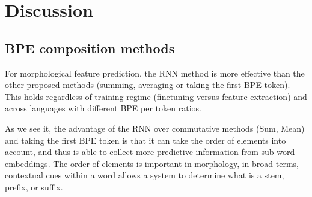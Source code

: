 \documentclass[11pt]{article}
\newcommand\jp[1]{(\textbf{JP:} #1)}
\begin{document}
\begin{figure}
	\end{figure}

	
	
	\section{Discussion}

    \subsection{BPE composition methods}
        For morphological feature prediction, the RNN method is more
     effective than the other proposed methods (summing, averaging or
     taking the first BPE token). This holds regardless of training
     regime (finetuning versus feature extraction) and across
     languages with different BPE per token ratios.
    
             As we see it, the advantage of the RNN over commutative
     methods (Sum, Mean) and taking the first BPE token is that it can
     take the order of elements into account, and thus is able to
     collect more predictive information from sub-word embeddings. The
     order of elements is important in morphology, in broad terms,
     contextual cues within a word allows a system to determine what
     is a stem, prefix, or suffix.
    
\end{document}
